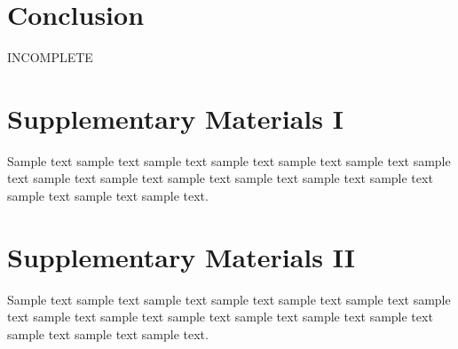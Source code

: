 \documentclass[11pt]{uonthesis}
\begin{document}
\chapter{Conclusion}

INCOMPLETE



\begin{appendices}

\chapter{Supplementary Materials I}

Sample text sample text sample text sample text sample text sample
text sample text sample text sample text sample text sample text
sample text sample text sample text sample text sample text.

\chapter{Supplementary Materials II}

Sample text sample text sample text sample text sample text sample
text sample text sample text sample text sample text sample text
sample text sample text sample text sample text sample text.

\end{appendices}
\end{document}
